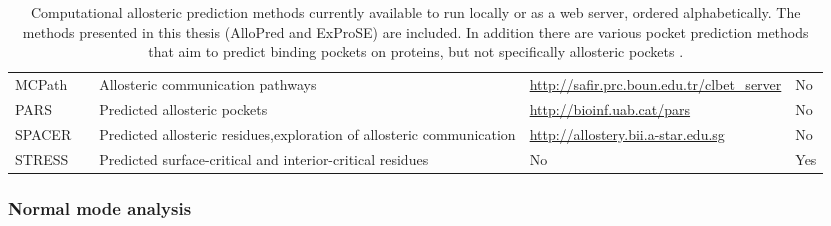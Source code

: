 \begin{table}
\begin{footnotesize}
\begin{tabular}{ l l p{5cm} l p{3cm} }
MCPath        & \cite{Kaya2013}                         & Allosteric communication pathways                                              & \url{http://safir.prc.boun.edu.tr/clbet_server} & No                                            \\
PARS          & \cite{Panjkovich2014, Panjkovich2012}   & Predicted allosteric pockets                                                   & \url{http://bioinf.uab.cat/pars}                & No                                            \\
SPACER        & \cite{Goncearenco2013, Mitternacht2011} & Predicted allosteric residues,\newline exploration of allosteric communication & \url{http://allostery.bii.a-star.edu.sg}        & No                                            \\
STRESS        & \cite{Clarke2016}                       & Predicted surface-critical and interior-critical residues                      & No                                              & Yes                                           \\
\hline
\end{tabular}
\end{footnotesize}

\caption[Computational allosteric prediction methods currently available to run locally or as a web server]
{Computational allosteric prediction methods currently available to run locally or as a web server, ordered alphabetically.
The methods presented in this thesis (AlloPred and ExProSE) are included.
In addition there are various pocket prediction methods that aim to predict binding pockets on proteins, but not specifically allosteric pockets \cite{Huang2006, LeGuilloux2009, Cimermancic2016}.}

\label{tab:prediction_methods}
\end{table}


\subsubsection{Normal mode analysis}

